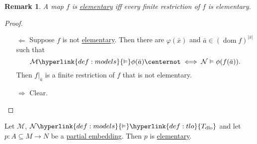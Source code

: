 \documentclass{article}
\let\models\vDash
\DeclareMathOperator{\dom}{dom}
\DeclareMathOperator{\img}{img}
\newtheorem{nremark}[nthm]{Remark}
\begin{document}
\begin{nremark}\label{rem:4.11}
  A map $f$ is \hyperlink{def:elmap}{elementary} iff every finite restriction of $f$ is elementary.
\end{nremark}
\begin{proof}\leavevmode
  \begin{itemize}
    \item[$\Leftarrow$] Suppose $f$ is not \hyperlink{def:elmap}{elementary}. Then there are $\varphi(\bar{x})$ and $\bar{a} \in (\dom f)^{|\bar{x}|}$ such that
      \begin{equation*}\mathcal{M} \hyperlink{def:models}{\models} \phi(\bar{a}) \centernot\iff \mathcal{N} \models \phi(f(\bar{a})).\end{equation*}
        Then $f|_{\bar{a}}$ is a finite restriction of $f$ that is not elementary.

  \item[$\Rightarrow$] Clear.\qedhere
  \end{itemize}
\end{proof}
\begin{nprop}\label{prop:4.12}
  Let $\mathcal{M}$, $\mathcal{N} \hyperlink{def:models}{\models} \hyperlink{def:tlo}{T_{\text{dlo}}}$ and let $p: A \subseteq M \to N$ be a \hyperlink{def:pe}{partial embedding}.
  Then $p$ is \hyperlink{def:elmap}{elementary}.
\end{nprop}
\end{document}
